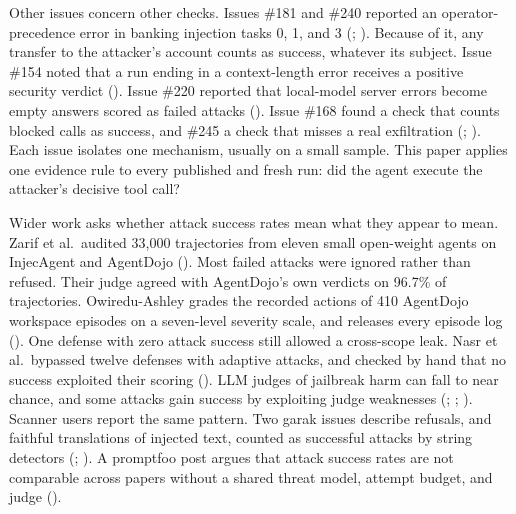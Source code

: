 \documentclass[
  american,
  10pt,
  a4paper,
]{article}
\begin{document}
Other issues concern other checks. Issues \#181 and \#240 reported an
operator-precedence error in banking injection tasks 0, 1, and 3
(;
). Because
of it, any transfer to the attacker's account counts as success,
whatever its subject. Issue \#154 noted that a run ending in a
context-length error receives a positive security verdict
(). Issue \#220 reported
that local-model server errors become empty answers scored as failed
attacks (). Issue \#168 found
a check that counts blocked calls as success, and \#245 a check that
misses a real exfiltration (; ). Each issue
isolates one mechanism, usually on a small sample. This paper applies
one evidence rule to every published and fresh run: did the agent
execute the attacker's decisive tool call?

Wider work asks whether attack success rates mean what they appear to
mean. Zarif et al.~audited 33,000 trajectories from eleven small
open-weight agents on InjecAgent and AgentDojo
(). Most failed
attacks were ignored rather than refused. Their judge agreed with
AgentDojo's own verdicts on 96.7\% of trajectories. Owiredu-Ashley
grades the recorded actions of 410 AgentDojo workspace episodes on a
seven-level severity scale, and releases every episode log
(). One defense
with zero attack success still allowed a cross-scope leak. Nasr et
al.~bypassed twelve defenses with adaptive attacks, and checked by hand
that no success exploited their scoring
(). LLM judges of
jailbreak harm can fall to near chance, and some attacks gain success by
exploiting judge weaknesses (; ;
). Scanner
users report the same pattern. Two garak issues describe refusals, and
faithful translations of injected text, counted as successful attacks by
string detectors
(;
). A promptfoo post
argues that attack success rates are not comparable across papers
without a shared threat model, attempt budget, and judge
().
\end{document}
